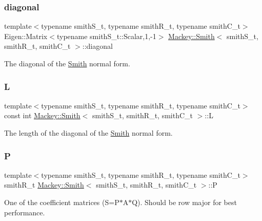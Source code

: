 \subsubsection{\texorpdfstring{diagonal}{diagonal}}
{\footnotesize\ttfamily template$<$typename smith\+S\+\_\+t, typename smith\+R\+\_\+t, typename smith\+C\+\_\+t$>$ \\
Eigen\+::\+Matrix$<$typename smith\+S\+\_\+t\+::\+Scalar,1,-\/1$>$ \hyperlink{classMackey_1_1Smith}{Mackey\+::\+Smith}$<$ smith\+S\+\_\+t, smith\+R\+\_\+t, smith\+C\+\_\+t $>$\+::diagonal}



The diagonal of the \hyperlink{classMackey_1_1Smith}{Smith} normal form. 

\mbox{\label{classMackey_1_1Smith_a02ea735836a4a70f504e360495b0e1e1}} 
\subsubsection{\texorpdfstring{L}{L}}
{\footnotesize\ttfamily template$<$typename smith\+S\+\_\+t, typename smith\+R\+\_\+t, typename smith\+C\+\_\+t$>$ \\
const int \hyperlink{classMackey_1_1Smith}{Mackey\+::\+Smith}$<$ smith\+S\+\_\+t, smith\+R\+\_\+t, smith\+C\+\_\+t $>$\+::L}



The length of the diagonal of the \hyperlink{classMackey_1_1Smith}{Smith} normal form. 

\mbox{\label{classMackey_1_1Smith_a5a831316edd85dedc7394b39fda103a2}} 
\subsubsection{\texorpdfstring{P}{P}}
{\footnotesize\ttfamily template$<$typename smith\+S\+\_\+t, typename smith\+R\+\_\+t, typename smith\+C\+\_\+t$>$ \\
smith\+R\+\_\+t \hyperlink{classMackey_1_1Smith}{Mackey\+::\+Smith}$<$ smith\+S\+\_\+t, smith\+R\+\_\+t, smith\+C\+\_\+t $>$\+::P}



One of the coefficient matrices (S=P$\ast$\+A$\ast$Q). Should be row major for best performance. 

